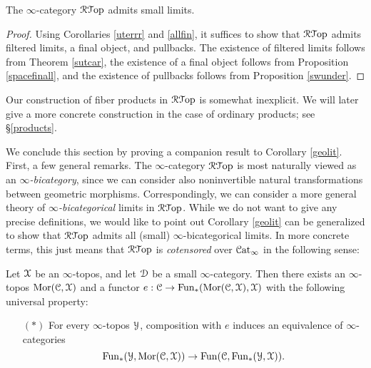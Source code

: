 \begin{corollary}\label{geolit}
The $\infty$-category $\operatorname{\mathcal{R}{\mathcal T}op}$ admits small limits.
\end{corollary}

\begin{proof}
Using Corollaries \ref{uterrr} and \ref{allfin}, it suffices to show that $\operatorname{\mathcal{R}{\mathcal T}op}$ admits filtered limits, a final object, and pullbacks. The existence of filtered limits follows from Theorem \ref{sutcar}, the existence of a final object follows from Proposition \ref{spacefinall}, and the existence of pullbacks follows from Proposition \ref{swunder}.
\end{proof}

\begin{remark}
Our construction of fiber products in $\operatorname{\mathcal{R}{\mathcal T}op}$ is somewhat inexplicit. We will later give a more concrete construction in the case of ordinary products; see \S \ref{products}.
\end{remark}

We conclude this section by proving a companion result to Corollary \ref{geolit}. First, a few general remarks. The $\infty$-category $\operatorname{\mathcal{R}{\mathcal T}op}$ is most naturally viewed as an {\it $\infty$-bicategory}, since we can consider also noninvertible natural transformations between geometric morphisms. Correspondingly, we can consider a more general theory of {\it $\infty$-bicategorical} limits in $\operatorname{\mathcal{R}{\mathcal T}op}$. While we do not want to give any precise definitions, we would like to point out Corollary \ref{geolit} can be generalized to show that $\operatorname{\mathcal{R}{\mathcal T}op}$ admits all (small) $\infty$-bicategorical limits. In more concrete terms, this just means that $\operatorname{\mathcal{R}{\mathcal T}op}$ is {\it cotensored} over $\operatorname{\mathcal{C}at}_{\infty}$ in the following sense:

\begin{proposition}\label{cotens}
Let $\operatorname{\mathcal{X}}$ be an $\infty$-topos, and let $\operatorname{\mathcal{D}}$ be a small $\infty$-category. Then there exists an $\infty$-topos $\operatorname{Mor}(\operatorname{\mathcal{C}}, \operatorname{\mathcal{X}})$ and a functor $e: \operatorname{\mathcal{C}} \rightarrow \operatorname{Fun}_{\ast}( \operatorname{Mor}(\operatorname{\mathcal{C}}, \operatorname{\mathcal{X}}), \operatorname{\mathcal{X}})$
with the following universal property:
\begin{itemize}
\item[$(\ast)$] For every $\infty$-topos $\operatorname{\mathcal{Y}}$, composition with $e$ induces an equivalence of $\infty$-categories
$$ \operatorname{Fun}_{\ast}( \operatorname{\mathcal{Y}}, \operatorname{Mor}(\operatorname{\mathcal{C}}, \operatorname{\mathcal{X}}) ) \rightarrow \operatorname{Fun}( \operatorname{\mathcal{C}}, \operatorname{Fun}_{\ast}( \operatorname{\mathcal{Y}}, \operatorname{\mathcal{X}}) ).$$
\end{itemize}
\end{proposition}

